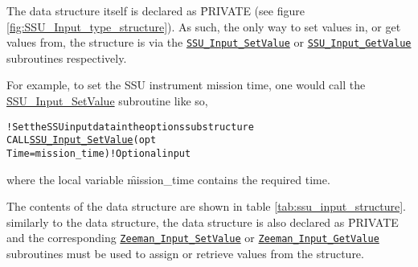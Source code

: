 The \hyperref[sec:ssu_input_structure]{\SSUInput} data structure itself is declared as \f{PRIVATE} (see figure \ref{fig:SSU_Input_type_structure}). As such, the only way to set values in, or get values from, the structure is via the \hyperref[sec:SSU_Input_SetValue_interface]{\texttt{SSU\_Input\_SetValue}} or \hyperref[sec:SSU_Input_GetValue_interface]{\texttt{SSU\_Input\_GetValue}} subroutines respectively.

For example, to set the SSU instrument mission time, one would call the \hyperref[sec:SSU_Input_SetValue_interface]{\f{SSU\_Input\_SetValue}} subroutine like so,

\begin{alltt}
  ! Set the SSU input data in the options substructure
  CALL \hyperref[sec:SSU_Input_SetValue_interface]{SSU_Input_SetValue}( opt%\textcolor{red}{SSU_Input}    , &  ! Object
                           Time=mission_time  )  ! Optional input\end{alltt}

where the local variable \f{mission\_time} contains the required time.

The contents of the \hyperref[sec:zeeman_input_structure]{\ZeemanInput} data structure are shown in table \ref{tab:ssu_input_structure}. similarly to the \hyperref[sec:ssu_input_structure]{\SSUInput} data structure, the \hyperref[sec:zeeman_input_structure]{\ZeemanInput} data structure is also declared as \f{PRIVATE} and the corresponding \hyperref[sec:Zeeman_Input_SetValue_interface]{\texttt{Zeeman\_Input\_SetValue}} or \hyperref[sec:Zeeman_Input_GetValue_interface]{\texttt{Zeeman\_Input\_GetValue}} subroutines must be used to assign or retrieve values from the structure.

